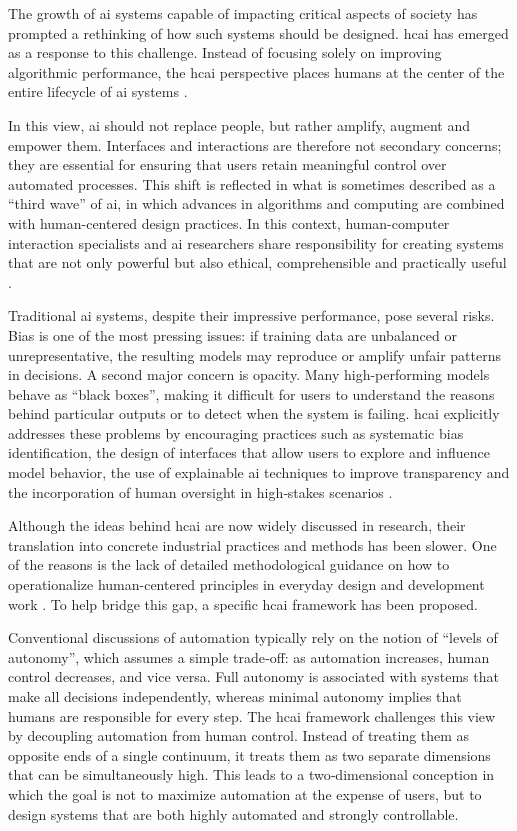 \documentclass[twoside,final]{Contexto}
\begin{document}
The growth of \gls{ai} systems capable of impacting critical aspects of society has prompted a rethinking of how such systems should be designed. \gls{hcai} has emerged as a response to this challenge. Instead of focusing solely on improving algorithmic performance, the \gls{hcai} perspective places humans at the center of the entire lifecycle of \gls{ai} systems \cite{shneiderman2022human}.

In this view, \gls{ai} should not replace people, but rather amplify, augment and empower them. Interfaces and interactions are therefore not secondary concerns; they are essential for ensuring that users retain meaningful control over automated processes. This shift is reflected in what is sometimes described as a ``third wave'' of \gls{ai}, in which advances in algorithms and computing are combined with human-centered design practices. In this context, human-computer interaction specialists and \gls{ai} researchers share responsibility for creating systems that are not only powerful but also ethical, comprehensible and practically useful \cite{xu2019toward}.

Traditional \gls{ai} systems, despite their impressive performance, pose several risks. Bias is one of the most pressing issues: if training data are unbalanced or unrepresentative, the resulting models may reproduce or amplify unfair patterns in decisions. A second major concern is opacity. Many high-performing models behave as ``black boxes'', making it difficult for users to understand the reasons behind particular outputs or to detect when the system is failing. \gls{hcai} explicitly addresses these problems by encouraging practices such as systematic bias identification, the design of interfaces that allow users to explore and influence model behavior, the use of explainable \gls{ai} techniques to improve transparency and the incorporation of human oversight in high‑stakes scenarios \cite{chen2023human}.

Although the ideas behind \gls{hcai} are now widely discussed in research, their translation into concrete industrial practices and methods has been slower. One of the reasons is the lack of detailed methodological guidance on how to operationalize human-centered principles in everyday design and development work \cite{hartikainen2022human}. To help bridge this gap, a specific \gls{hcai} framework has been proposed.

Conventional discussions of automation typically rely on the notion of ``levels of autonomy'', which assumes a simple trade‑off: as automation increases, human control decreases, and vice versa. Full autonomy is associated with systems that make all decisions independently, whereas minimal autonomy implies that humans are responsible for every step. The \gls{hcai} framework challenges this view by decoupling automation from human control. Instead of treating them as opposite ends of a single continuum, it treats them as two separate dimensions that can be simultaneously high. This leads to a two‑dimensional conception in which the goal is not to maximize automation at the expense of users, but to design systems that are both highly automated and strongly controllable.
\end{document}
